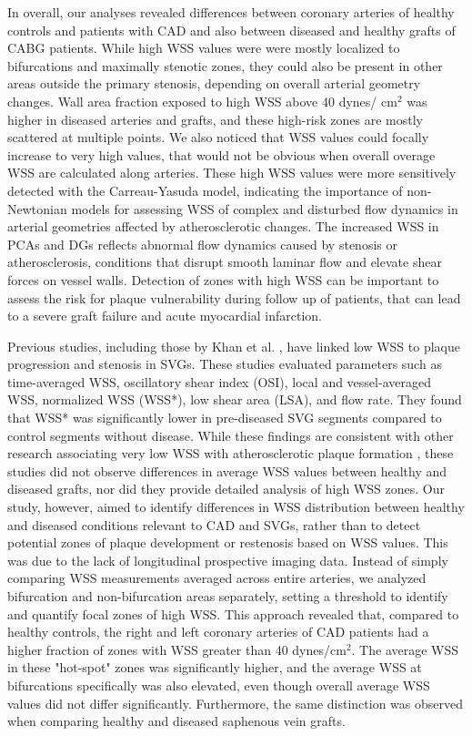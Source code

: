 ﻿\documentclass[12pt,a4paper]{article}
\theoremstyle{definition}
\numberwithin{equation}{section}
\begin{document}
In overall, our analyses revealed differences between coronary arteries of healthy controls and patients with CAD and also between diseased and healthy grafts of CABG patients. While high WSS values were were mostly localized to bifurcations and maximally stenotic zones, they could also be present in other areas outside the primary stenosis, depending on overall arterial geometry changes. Wall area fraction exposed to high WSS above 40 dynes/ cm$^2$ was higher in diseased arteries and grafts, and these high-risk zones are mostly scattered at multiple points. We also noticed that WSS values could focally increase to very high values, that would not be obvious when overall overage WSS are calculated along arteries. These high WSS values were more sensitively detected with the Carreau-Yasuda model, indicating the importance of non-Newtonian models for assessing WSS of complex and disturbed flow dynamics in arterial geometries affected by atherosclerotic changes. The increased WSS in PCAs and DGs reflects abnormal flow dynamics caused by stenosis or atherosclerosis, conditions that disrupt smooth laminar flow and elevate shear forces on vessel walls. Detection of zones with high WSS can be important to assess the risk for plaque vulnerability during follow up of patients, that can lead to a severe graft failure and acute myocardial infarction. 


Previous studies, including those by Khan et al. \cite{3}, have linked low WSS to plaque progression and stenosis in SVGs. These studies evaluated parameters such as time-averaged WSS, oscillatory shear index (OSI), local and vessel-averaged WSS, normalized WSS (WSS*), low shear area (LSA), and flow rate. They found that WSS* was significantly lower in pre-diseased SVG segments compared to control segments without disease. While these findings are consistent with other research associating very low WSS with atherosclerotic plaque formation \cite{33, 42, 49, 50}, these studies did not observe differences in average WSS values between healthy and diseased grafts, nor did they provide detailed analysis of high WSS zones. Our study, however, aimed to identify differences in WSS distribution between healthy and diseased conditions relevant to CAD and SVGs, rather than to detect potential zones of plaque development or restenosis based on WSS values. This was due to the lack of longitudinal prospective imaging data. Instead of simply comparing WSS measurements averaged across entire arteries, we analyzed bifurcation and non-bifurcation areas separately, setting a threshold to identify and quantify focal zones of high WSS. This approach revealed that, compared to healthy controls, the right and left coronary arteries of CAD patients had a higher fraction of zones with WSS greater than 40 dynes/cm$^2$. The average WSS in these "hot-spot" zones was significantly higher, and the average WSS at bifurcations specifically was also elevated, even though overall average WSS values did not differ significantly. Furthermore, the same distinction was observed when comparing healthy and diseased saphenous vein grafts.
\end{document}
